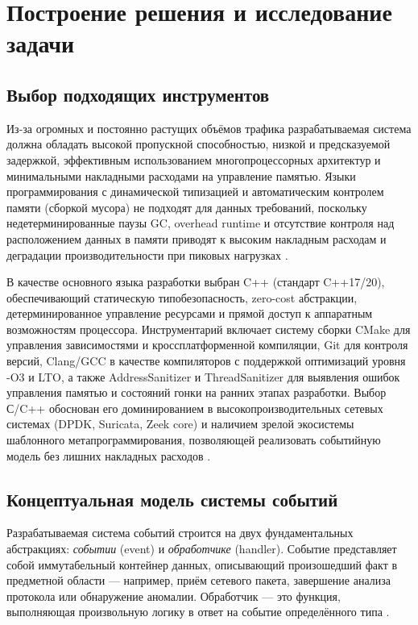\section{Построение решения и исследование задачи}
\subsection{Выбор подходящих инструментов}

Из-за огромных и постоянно растущих объёмов трафика разрабатываемая система должна обладать высокой пропускной способностью, низкой и предсказуемой задержкой, эффективным использованием многопроцессорных архитектур и минимальными накладными расходами на управление памятью.
Языки программирования с динамической типизацией и автоматическим контролем памяти (сборкой мусора) не подходят для данных требований, поскольку недетерминированные паузы GC, overhead runtime и отсутствие контроля над расположением данных в памяти приводят к высоким накладным расходам и деградации производительности при пиковых нагрузках \cite{realtime2021gc}.

В качестве основного языка разработки выбран C++ (стандарт C++17/20), обеспечивающий статическую типобезопасность, zero-cost абстракции, детерминированное управление ресурсами и прямой доступ к аппаратным возможностям процессора.
Инструментарий включает систему сборки CMake для управления зависимостями и кроссплатформенной компиляции, Git для контроля версий, Clang/GCC в качестве компиляторов с поддержкой оптимизаций уровня -O3 и LTO, а также AddressSanitizer и ThreadSanitizer для выявления ошибок управления памятью и состояний гонки на ранних этапах разработки.
Выбор С/C++ обоснован его доминированием в высокопроизводительных сетевых системах (DPDK, Suricata, Zeek core) и наличием зрелой экосистемы шаблонного метапрограммирования, позволяющей реализовать событийную модель без лишних накладных расходов \cite{cpp2023perf}.

\subsection{Концептуальная модель системы событий}

Разрабатываемая система событий строится на двух фундаментальных абстракциях: \textit{событии} (event) и \textit{обработчике} (handler). Событие представляет собой иммутабельный контейнер данных, описывающий произошедший факт в предметной области --- например, приём сетевого пакета, завершение анализа протокола или обнаружение аномалии. Обработчик --- это функция, выполняющая произвольную логику в ответ на событие определённого типа \cite{richards2020fundamentals}.

